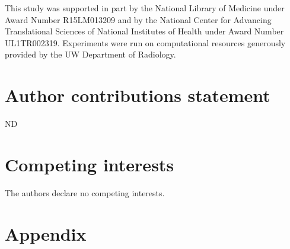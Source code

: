\documentclass[sort&compress, numafflabel]{elsarticle}
\begin{document}
This study was supported in part by the National Library of Medicine under Award Number R15LM013209 and by the National Center for Advancing Translational Sciences of National Institutes of Health under Award Number UL1TR002319. Experiments were run on computational resources generously provided by the UW Department of Radiology.

\section*{Author contributions statement}

ND 

\section*{Competing interests}

The authors declare no competing interests.



\section*{Appendix}
\label{sec:appendix}


\end{document}
